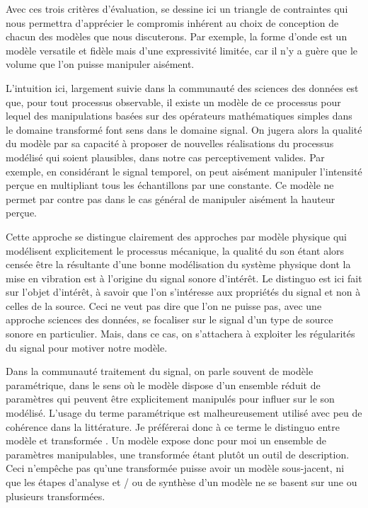 Avec ces trois critères d'évaluation, se dessine ici un triangle de contraintes qui nous permettra d'apprécier le compromis inhérent au choix de conception de chacun des modèles que nous discuterons. Par exemple, la forme d'onde est un modèle versatile et fidèle mais d'une expressivité limitée, car il n'y a guère que le volume que l'on puisse manipuler aisément.

L'intuition ici, largement suivie dans la communauté des sciences des données est que, pour tout processus observable, il existe un modèle de ce processus pour lequel des manipulations basées sur des opérateurs mathématiques simples dans le domaine transformé \og font sens \fg dans le domaine signal. On jugera alors la qualité du modèle par sa capacité à proposer de nouvelles réalisations du processus modélisé qui soient plausibles, dans notre cas perceptivement valides. Par exemple, en considérant le signal temporel, on peut aisément manipuler l'intensité perçue en multipliant tous les échantillons par une constante. Ce modèle ne permet par contre pas dans le cas général de manipuler aisément la hauteur perçue.

Cette approche se distingue clairement des approches par \og modèle physique \fg qui modélisent explicitement le processus mécanique, la qualité du son étant alors censée être la résultante d'une bonne modélisation du système physique dont la mise en vibration est à l'origine du signal sonore d'intérêt. Le distinguo est ici fait sur l'objet d'intérêt, à savoir que l'on s'intéresse aux propriétés du signal et non à celles de la source. Ceci ne veut pas dire que l'on ne puisse pas, avec une approche sciences des données, se focaliser sur le signal d'un type de source sonore en particulier. Mais, dans ce cas, on s'attachera à exploiter les régularités du signal pour motiver notre modèle.

Dans la communauté traitement du signal, on parle souvent de modèle paramétrique, dans le sens où le modèle dispose d'un ensemble réduit de paramètres qui peuvent être explicitement manipulés pour influer sur le son modélisé. L'usage du terme \og paramétrique \fg est malheureusement utilisé avec peu de cohérence dans la littérature. Je préférerai donc à ce terme le distinguo entre \og modèle \fg et \og transformée \fg. Un modèle expose donc pour moi un ensemble de paramètres manipulables, une transformée étant plutôt un outil de description. Ceci n'empêche pas qu'une transformée puisse avoir un modèle sous-jacent, ni que les étapes d'analyse et / ou de synthèse d'un modèle ne se basent sur une ou plusieurs transformées.

